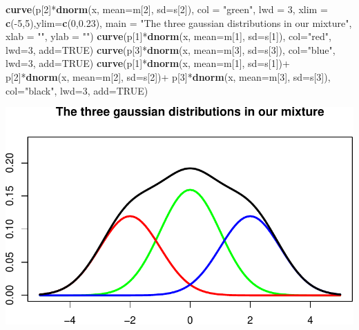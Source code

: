 \documentclass[]{article}
\newenvironment{Shaded}{\begin{snugshade}}{\end{snugshade}}
\newcommand{\KeywordTok}[1]{\textcolor[rgb]{0.13,0.29,0.53}{\textbf{{#1}}}}
\newcommand{\DataTypeTok}[1]{\textcolor[rgb]{0.13,0.29,0.53}{{#1}}}
\newcommand{\DecValTok}[1]{\textcolor[rgb]{0.00,0.00,0.81}{{#1}}}
\newcommand{\FloatTok}[1]{\textcolor[rgb]{0.00,0.00,0.81}{{#1}}}
\newcommand{\StringTok}[1]{\textcolor[rgb]{0.31,0.60,0.02}{{#1}}}
\newcommand{\OtherTok}[1]{\textcolor[rgb]{0.56,0.35,0.01}{{#1}}}
\newcommand{\NormalTok}[1]{{#1}}
\begin{document}
\begin{Shaded}
\begin{Highlighting}[]
\KeywordTok{curve}\NormalTok{(p[}\DecValTok{2}\NormalTok{]*}\KeywordTok{dnorm}\NormalTok{(x, }\DataTypeTok{mean=}\NormalTok{m[}\DecValTok{2}\NormalTok{], }\DataTypeTok{sd=}\NormalTok{s[}\DecValTok{2}\NormalTok{]),}
      \DataTypeTok{col =} \StringTok{"green"}\NormalTok{, }\DataTypeTok{lwd =} \DecValTok{3}\NormalTok{, }
      \DataTypeTok{xlim =} \KeywordTok{c}\NormalTok{(-}\DecValTok{5}\NormalTok{,}\DecValTok{5}\NormalTok{),}\DataTypeTok{ylim=}\KeywordTok{c}\NormalTok{(}\DecValTok{0}\NormalTok{,}\FloatTok{0.23}\NormalTok{),}
      \DataTypeTok{main =} \StringTok{"The three gaussian distributions in our mixture"}\NormalTok{,}
      \DataTypeTok{xlab =} \StringTok{""}\NormalTok{, }\DataTypeTok{ylab =} \StringTok{""}\NormalTok{)}
\KeywordTok{curve}\NormalTok{(p[}\DecValTok{1}\NormalTok{]*}\KeywordTok{dnorm}\NormalTok{(x, }\DataTypeTok{mean=}\NormalTok{m[}\DecValTok{1}\NormalTok{], }\DataTypeTok{sd=}\NormalTok{s[}\DecValTok{1}\NormalTok{]),}
      \DataTypeTok{col=}\StringTok{"red"}\NormalTok{, }\DataTypeTok{lwd=}\DecValTok{3}\NormalTok{, }\DataTypeTok{add=}\OtherTok{TRUE}\NormalTok{)}
\KeywordTok{curve}\NormalTok{(p[}\DecValTok{3}\NormalTok{]*}\KeywordTok{dnorm}\NormalTok{(x, }\DataTypeTok{mean=}\NormalTok{m[}\DecValTok{3}\NormalTok{], }\DataTypeTok{sd=}\NormalTok{s[}\DecValTok{3}\NormalTok{]),}
      \DataTypeTok{col=}\StringTok{"blue"}\NormalTok{, }\DataTypeTok{lwd=}\DecValTok{3}\NormalTok{, }\DataTypeTok{add=}\OtherTok{TRUE}\NormalTok{)}
\KeywordTok{curve}\NormalTok{(p[}\DecValTok{1}\NormalTok{]*}\KeywordTok{dnorm}\NormalTok{(x, }\DataTypeTok{mean=}\NormalTok{m[}\DecValTok{1}\NormalTok{], }\DataTypeTok{sd=}\NormalTok{s[}\DecValTok{1}\NormalTok{])+}
\StringTok{      }\NormalTok{p[}\DecValTok{2}\NormalTok{]*}\KeywordTok{dnorm}\NormalTok{(x, }\DataTypeTok{mean=}\NormalTok{m[}\DecValTok{2}\NormalTok{], }\DataTypeTok{sd=}\NormalTok{s[}\DecValTok{2}\NormalTok{])+}
\StringTok{      }\NormalTok{p[}\DecValTok{3}\NormalTok{]*}\KeywordTok{dnorm}\NormalTok{(x, }\DataTypeTok{mean=}\NormalTok{m[}\DecValTok{3}\NormalTok{], }\DataTypeTok{sd=}\NormalTok{s[}\DecValTok{3}\NormalTok{]),}
      \DataTypeTok{col=}\StringTok{"black"}\NormalTok{, }\DataTypeTok{lwd=}\DecValTok{3}\NormalTok{, }\DataTypeTok{add=}\OtherTok{TRUE}\NormalTok{)}
\end{Highlighting}
\end{Shaded}

\includegraphics{probability_files/figure-latex/unnamed-chunk-19-1.pdf}
\end{document}
